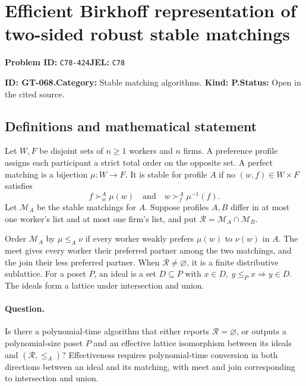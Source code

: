 \documentclass[11pt,a4paper]{article}
\begin{document}
\section*{Efficient Birkhoff representation of two-sided robust stable matchings}
\textbf{Problem ID:} \texttt{C78-424}\quad \textbf{JEL:} \texttt{C78}\par
\label{problem:OP-0198}
\label{game:GT-068}
{\sffamily\small\color{muted}
\noindent\textbf{ID: GT-068.}\quad\textbf{Category:} Stable matching algorithms.
\quad\textbf{Kind: P.}\quad\textbf{Status:} Open in the cited source.
\par}
\subsection*{Definitions and mathematical statement}
Let \(W,F\) be disjoint sets of \(n\geq1\) workers and \(n\) firms.
A preference profile assigns each participant a strict total order on
the opposite set. A perfect matching is a bijection \(\mu:W\to F\).
It is stable for profile \(A\) if no \((w,f)\in W\times F\) satisfies
\[
 f\succ^A_w\mu(w)
 \quad\text{and}\quad
 w\succ^A_f\mu^{-1}(f).
\]
Let \(\mathcal M_A\) be the stable matchings for \(A\).
Suppose profiles \(A,B\) differ in at most one worker's list and at most
one firm's list, and put \(\mathcal R=\mathcal M_A\cap\mathcal M_B\).

Order \(\mathcal M_A\) by \(\mu\leq_A\nu\) if every worker weakly
prefers \(\mu(w)\) to \(\nu(w)\) in \(A\). The meet gives every worker
their preferred partner among the two matchings, and the join their less
preferred partner. When \(\mathcal R\ne\varnothing\), it is a finite
distributive sublattice. For a poset \(P\), an ideal is a set
\(D\subseteq P\) with \(x\in D,\ y\leq_P x\Rightarrow y\in D\).
The ideals form a lattice under intersection and union.

\paragraph{Question.}
Is there a polynomial-time algorithm that either reports
\(\mathcal R=\varnothing\), or outputs a polynomial-size poset \(P\)
and an effective lattice isomorphism between its ideals and
\((\mathcal R,\leq_A)\)? Effectiveness requires polynomial-time
conversion in both directions between an ideal and its matching,
with meet and join corresponding to intersection and union.
\end{document}
